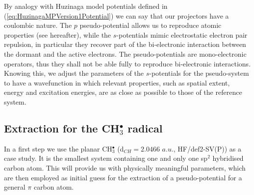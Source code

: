 \documentclass[aip,reprint]{revtex4-1}
\begin{document}
By analogy with Huzinaga model potentials defined in (\ref{eq:HuzinagaMPVersion1Potential})
we can say that our projectors have a coulombic nature.
The \(p\) pseudo-potential allows us to reproduce atomic properties (see hereafter), while the
\(s\)-potentials mimic electrostatic electron pair repulsion, in particular they 
recover part of the bi-electronic interaction
between the dormant and the active electrons. The pseudo-potentials are mono-electronic operators, thus they shall not be able fully to reproduce bi-electronic interactions. Knowing this, we adjust the parameters of the \(s\)-potentials for the pseudo-system to have a wavefunction in which relevant properties, such as spatial extent, energy and excitation energies, are as close as possible to those of the reference system.

\subsection{Extraction for the CH$_3^\bullet$ radical}
\label{section:potential_derivation}

In a first step we use the planar CH\(^{\bullet}_{3}\) (d$_{CH}=2.0466$ $a.u.$, HF/def2-SV(P)) as 
a case study.
It is the smallest system containing one and only one sp$^2$ hybridised carbon atom.
This will provide us with physically meaningful parameters, which are then employed as
initial guess for the extraction of a pseudo-potential for a general $\pi$ carbon atom.
\end{document}
